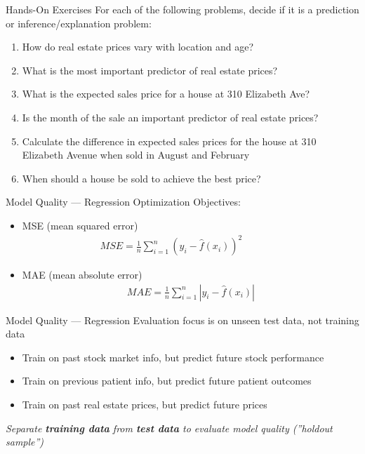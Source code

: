 \documentclass[ignorenonframetext,xcolor=x11names]{beamer}
\begin{document}
\begin{frame}{Hands-On Exercises}
For each of the following problems, decide if it is a prediction or inference/explanation problem:
\begin{enumerate}
   \item How do real estate prices vary with location and age?
   \item What is the most important predictor of real estate prices?
   \item What is the expected sales price for a house at 310 Elizabeth Ave?
   \item Is the month of the sale an important predictor of real estate prices?
   \item Calculate the difference in expected sales prices for the house at 310 Elizabeth Avenue when sold in August and February
   \item When should a house be sold to achieve the best price?
\end{enumerate}
\end{frame}

\begin{frame}{Model Quality --- Regression}
Optimization Objectives:

\begin{itemize}
   \item MSE (mean squared error)
\begin{align*}
MSE = \frac{1}{n}\sum_{i=1}^n (y_i - \hat{f}(x_i))^2 \qquad \qquad
\end{align*} \hspace{.75in}{\footnotesize(MSE is susceptible to outliers)}
   \item MAE (mean absolute error)
\begin{align*}
MAE = \frac{1}{n}\sum_{i=1}^n |y_i - \hat{f}(x_i)|
\end{align*}
\end{itemize}
\end{frame}

\begin{frame}{Model Quality --- Regression}
Evaluation focus is on unseen test data, not training data
   \begin{itemize}
      \item Train on past stock market info, but predict future stock performance
      \item Train on previous patient info, but predict future patient outcomes
      \item Train on past real estate prices, but predict future prices
   \end{itemize}
\vspace{\baselineskip}
\emph{Separate \textbf{training data} from \textbf{test data} to evaluate model quality (''holdout sample'')}
\end{frame}
\end{document}
